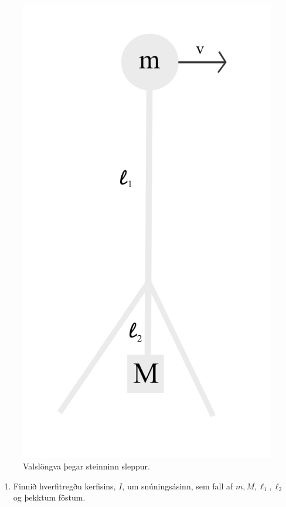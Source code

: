 \ifdefined \wholebook \else\documentclass[oneside]{book}\usepackage{EdlBook}\graphicspath{{figures/}}
\begin{document}
\begin{enumerate}[label = \textbf{Dæmi \thechapter.\arabic*.}]
\begin{figure}[ht]
\begin{minipage}[b]{0.65\linewidth}
    \includegraphics[scale = 0.8]{images/al.png}
    \caption{Valslöngva þegar steinninn sleppur.}
    \label{throw}
\end{minipage}
\end{figure}

\begin{enumerate}[label=\textbf{(\alph*)}]
    \item Finnið hverfitregðu kerfisins, $I$, um snúningsásinn, sem fall af $m, M, \ell_1, \ell_2$ og þekktum föstum.
    

\end{enumerate}
\end{enumerate}
\end{document}

